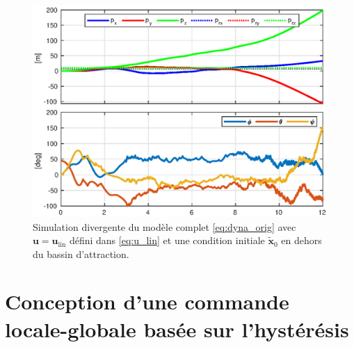 \begin{figure}[ht!]
    \centering
    \includegraphics[trim=0cm 0cm 0cm 0cm,clip,width=0.8\columnwidth]{figures/diverge2.eps}
    \caption{Simulation divergente du modèle complet \eqref{eq:dyna_orig} avec $\boldsymbol{u} = \boldsymbol{u}_{\text{lin}}$ défini dans 
    \eqref{eq:u_lin} et une condition initiale $\tilde{ \boldsymbol{x}}_0$ en dehors du bassin d'attraction.}
    \label{fig_linearize_div}
\end{figure}



\section{Conception d'une commande locale-globale basée sur l'hystérésis}
\label{sec:ctrl_hyste}
 

